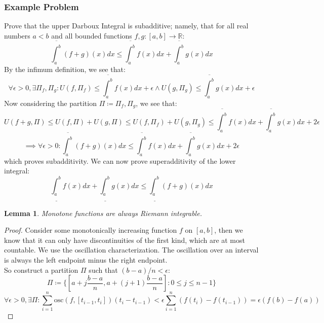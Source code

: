 \documentclass[10pt,letterpaper]{article} %
\newtheorem{lem}{Lemma}[section]
\begin{document}
\subsubsection{Example Problem}
Prove that the upper Darboux Integral is subadditive; namely, that for all real numbers $a < b$ and all bounded functions $f, g: [a, b] \xrightarrow{} \mathbb{R}$:
\begin{equation*}
\overline{\int_{a}^{b}}(f+g)(x)dx \leqslant \overline{\int_{a}^{b}}f(x)dx + \overline{\int_{a}^{b}}g(x)dx
\end{equation*}
By the infimum definition, we see that:
\begin{equation*}
\forall \epsilon > 0, \exists \Pi_f, \Pi_g: U(f, \Pi_f) \leqslant \overline{\int_{a}^{b}}f(x)dx + \epsilon \land U(g, \Pi_g) \leqslant \overline{\int_{a}^{b}}g(x)dx + \epsilon
\end{equation*}
Now considering the partition $\Pi \coloneq \Pi_f, \Pi_g$, we see that:
\begin{equation*}
U(f+g, \Pi) \leqslant U(f, \Pi) + U(g, \Pi) \leqslant U(f, \Pi_f) + U(g, \Pi_g) \leqslant \overline{\int_{a}^{b}}f(x)dx + \overline{\int_{a}^{b}}g(x)dx + 2\epsilon
\end{equation*}
\begin{equation*}
\implies \forall \epsilon > 0: \overline{\int_{a}^{b}}(f+g)(x)dx \leqslant \overline{\int_{a}^{b}}f(x)dx + \overline{\int_{a}^{b}}g(x)dx + 2\epsilon
\end{equation*}
which proves subadditivity. We can now prove superadditivity of the lower integral:
\begin{equation*}
\underline{\int_{a}^{b}}f(x)dx + \underline{\int_{a}^{b}}g(x)dx \leqslant \underline{\int_{a}^{b}}(f+g)(x)dx 
\end{equation*}

\medskip
\begin{lem}
Monotone functions are always Riemann integrable.
\end{lem}
\begin{proof}
Consider some monotonically increasing function $f$ on $[a, b]$, then we know that it can only have discontinuities of the first kind, which are at most countable. We use the oscillation characterization. The oscillation over an interval is always the left endpoint minus the right endpoint.\\

So construct a partition $\Pi$ such that $(b-a)/n < \epsilon$:
\begin{equation*}
\Pi \coloneq \{[a + j\frac{b-a}{n}, a+(j+1)\frac{b-a}{n}] : 0 \leqslant j \leqslant n-1\}
\end{equation*}
\begin{equation*}
\forall \epsilon > 0, \exists \Pi: \sum_{i=1}^{n}\text{osc}(f, [t_{i-1}, t_i])(t_i - t_{i-1}) < \epsilon \sum_{i=1}^{n}(f(t_i) - f(t_{i-1})) = \epsilon (f(b) - f(a))
\end{equation*}
\end{proof}
\end{document}
